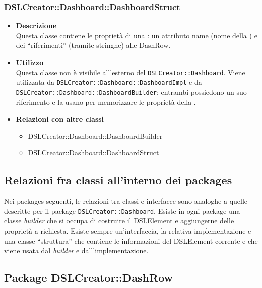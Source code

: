                 \subsubsection{DSLCreator::Dashboard::DashboardStruct}
                    \begin{itemize}
                        \item \textbf{Descrizione} \hfill \\
                            Questa classe contiene le proprietà di una : un attributo name (nome della ) e dei ``riferimenti'' (tramite stringhe) alle DashRow.
                        \item \textbf{Utilizzo} \hfill \\
                            Questa classe non è visibile all'esterno del  \texttt{DSLCreator::Dashboard}. Viene utilizzata da \texttt{DSLCreator::Dashboard::DashboardImpl} e da \texttt{DSLCreator::Dash\-board::DashboardBuilder}: entrambi possiedono un suo riferimento e la usano per memorizzare le proprietà della .
                        \item \textbf{Relazioni con altre classi}
                            \begin{itemize}
                              \item DSLCreator::Dashboard::DashboardBuilder
                              \item DSLCreator::Dashboard::DashboardStruct
                            \end{itemize}
                    \end{itemize}
                    
        \subsection{Relazioni fra classi all'interno dei packages}
        Nei packages seguenti, le relazioni tra classi e interfacce sono analoghe a quelle descritte per il package \texttt{DSLCreator::Dashboard}. Esiste in ogni package una classe \textit{builder} che si occupa di costruire il DSLElement e aggiungerne delle proprietà a richiesta. Esiste sempre un'interfaccia, la relativa implementazione e una classe ``struttura'' che contiene le informazioni del DSLElement corrente e che viene usata dal \textit{builder} e dall'implementazione.

        \subsection{Package DSLCreator::DashRow}
